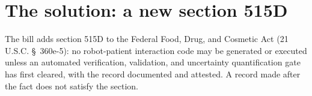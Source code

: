 \section{The solution: a new section 515D}
\label{sec:b}

The bill adds section 515D to the Federal Food, Drug, and Cosmetic Act (21 U.S.C. \S~360e-5): no robot-patient interaction code may be generated or executed unless an automated verification, validation, and uncertainty quantification gate has first cleared, with the record documented and attested. A record made after the fact does not satisfy the section.
